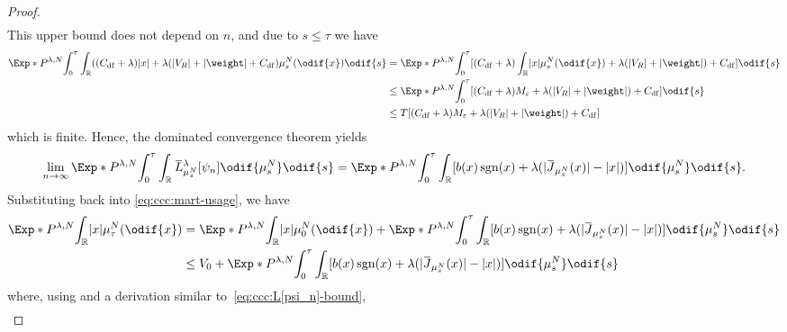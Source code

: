 \begin{proof}
\begin{equation}
\begin{split}
    \end{split}
  \end{equation}
  This upper bound does not depend on \( n \), and due to \( s \leq \tau \) we have
  \begin{equation}
    \begin{split}
    \Exp*{P^{\lambda, N}}{\int_0^\tau \int_\potspace \br{ (C_\mathrm{df} + \lambda) \abs{x} + \lambda (\abs{V_R} + \abs{\weight} + C_\mathrm{df} } \mu_{s}^N(\odif{x}) \odif{s} }
    &= \Exp*{P^{\lambda, N}}{\int_0^\tau \sbr{ (C_\mathrm{df} + \lambda) \int_\potspace \abs{x} \mu_{s}^N(\odif{x}) + \lambda (\abs{V_R} + \abs{\weight}) + C_\mathrm{df} } \odif{s} } \\
    &\leq \Exp*{P^{\lambda, N}}{\int_0^\tau \sbr{ (C_\mathrm{df} + \lambda) M_\eps + \lambda (\abs{V_R} + \abs{\weight}) + C_\mathrm{df} } \odif{s} } \\
    &\leq T \sbr{ (C_\mathrm{df} + \lambda) M_\eps + \lambda (\abs{V_R} + \abs{\weight}) + C_\mathrm{df} }
    \end{split}
  \end{equation}
  which is finite.
  Hence, the dominated convergence theorem yields
  \begin{equation}
    \lim_{n\to\infty} \Exp*{P^{\lambda, N}}{\int_0^\tau \int_\potspace \ol{L}_{\mu_{s}^N}^{\lambda} [\psi_n] \odif{\mu_{s}^N} \odif{s} }
    = \Exp*{P^{\lambda, N}}{\int_0^\tau \int_\potspace \sbr{ b(x) \sgn(x) + \lambda (\abs{\ol{J}_{\mu_{s}^N}(x)} - \abs{x}) } \odif{\mu_{s}^N} \odif{s} }.
  \end{equation}
  Substituting back into \eqref{eq:ccc:mart-usage}, we have
  \begin{equation}
    \begin{split}
    \Exp*{P^{\lambda, N}}{\int_\potspace \abs{x} \mu_\tau^N(\odif{x})} &= \Exp*{P^{\lambda, N}}{\int_\potspace \abs{x} \mu_0^N(\odif{x})} + \Exp*{P^{\lambda, N}}{\int_0^\tau \int_\potspace \sbr{ b(x) \sgn(x) + \lambda (\abs{\ol{J}_{\mu_{s}^N}(x)} - \abs{x}) } \odif{\mu_{s}^N} \odif{s} } \\
    &\leq V_0 + \Exp*{P^{\lambda, N}}{\int_0^\tau \int_\potspace \sbr{ b(x) \sgn(x) + \lambda (\abs{\ol{J}_{\mu_{s}^N}(x)} - \abs{x}) } \odif{\mu_{s}^N} \odif{s} } \\
    \end{split}
  \end{equation}
  where, using  and a derivation similar to~\eqref{eq:ccc:L[psi_n]-bound},
  \begin{equation}
    \begin{split}

\end{split}
\end{equation}
\end{proof}
